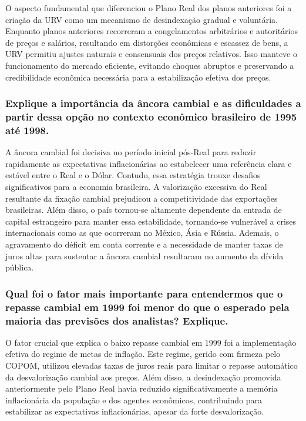 \documentclass[a4paper,12pt]{article}[abntex2]
\begin{document}
O aspecto fundamental que diferenciou o Plano Real dos planos anteriores foi a criação da URV como um mecanismo de desindexação gradual e voluntária. Enquanto planos anteriores recorreram a congelamentos arbitrários e autoritários de preços e salários, resultando em distorções econômicas e escassez de bens, a URV permitiu ajustes naturais e consensuais dos preços relativos. Isso manteve o funcionamento do mercado eficiente, evitando choques abruptos e preservando a credibilidade econômica necessária para a estabilização efetiva dos preços.

\subsubsection{\textbf{Explique a importância da âncora cambial e as dificuldades a partir dessa opção no contexto econômico brasileiro de 1995 até 1998.}}

A âncora cambial foi decisiva no período inicial pós-Real para reduzir rapidamente as expectativas inflacionárias ao estabelecer uma referência clara e estável entre o Real e o Dólar. Contudo, essa estratégia trouxe desafios significativos para a economia brasileira. A valorização excessiva do Real resultante da fixação cambial prejudicou a competitividade das exportações brasileiras. Além disso, o país tornou-se altamente dependente da entrada de capital estrangeiro para manter essa estabilidade, tornando-se vulnerável a crises internacionais como as que ocorreram no México, Ásia e Rússia. Ademais, o agravamento do déficit em conta corrente e a necessidade de manter taxas de juros altas para sustentar a âncora cambial resultaram no aumento da dívida pública.

\subsubsection{\textbf{Qual foi o fator mais importante para entendermos que o repasse cambial em 1999 foi menor do que o esperado pela maioria das previsões dos analistas? Explique.}}

O fator crucial que explica o baixo repasse cambial em 1999 foi a implementação efetiva do regime de metas de inflação. Este regime, gerido com firmeza pelo COPOM, utilizou elevadas taxas de juros reais para limitar o repasse automático da desvalorização cambial aos preços. Além disso, a desindexação promovida anteriormente pelo Plano Real havia reduzido significativamente a memória inflacionária da população e dos agentes econômicos, contribuindo para estabilizar as expectativas inflacionárias, apesar da forte desvalorização.
\end{document}
